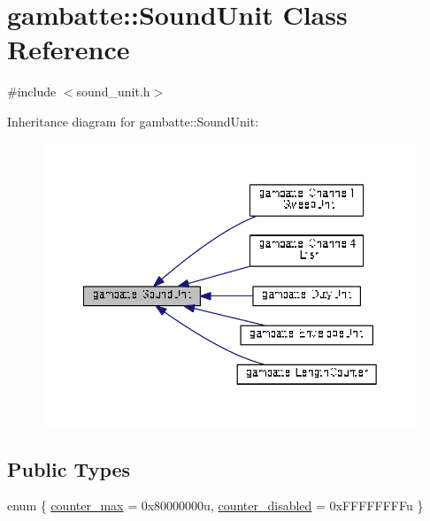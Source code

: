 \hypertarget{classgambatte_1_1SoundUnit}{}\section{gambatte\+:\+:Sound\+Unit Class Reference}
\label{classgambatte_1_1SoundUnit}


{\ttfamily \#include $<$sound\+\_\+unit.\+h$>$}



Inheritance diagram for gambatte\+:\+:Sound\+Unit\+:
\nopagebreak
\begin{figure}[H]
\begin{center}
\leavevmode
\includegraphics[width=350pt]{classgambatte_1_1SoundUnit__inherit__graph}
\end{center}
\end{figure}
\subsection*{Public Types}
\begin{DoxyCompactItemize}
\item 
enum \{ \hyperlink{classgambatte_1_1SoundUnit_a42980887d13053bdf6dfbdbece460ff8a9b3f5f9a9fb3bac559e001d5f0d3fff8}{counter\+\_\+max} = 0x80000000u, 
\hyperlink{classgambatte_1_1SoundUnit_a42980887d13053bdf6dfbdbece460ff8a0aa17344792e01301389d1a0fbe9a159}{counter\+\_\+disabled} = 0x\+F\+F\+F\+F\+F\+F\+F\+Fu
 \}
\end{DoxyCompactItemize}
